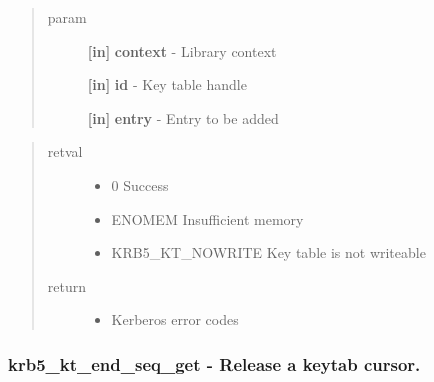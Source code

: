 \documentclass[letterpaper,10pt,english]{sphinxmanual}
\begin{document}
\begin{fulllineitems}
\label{appdev/refs/api/krb5_kt_add_entry:c.krb5_kt_add_entry}
\end{fulllineitems}

\begin{quote}\begin{description}
\item[{param}] \leavevmode
\textbf{{[}in{]}} \textbf{context} - Library context

\textbf{{[}in{]}} \textbf{id} - Key table handle

\textbf{{[}in{]}} \textbf{entry} - Entry to be added

\end{description}\end{quote}
\begin{quote}\begin{description}
\item[{retval}] \leavevmode\begin{itemize}
\item {} 
0   Success

\item {} 
ENOMEM   Insufficient memory

\item {} 
KRB5\_KT\_NOWRITE   Key table is not writeable

\end{itemize}

\item[{return}] \leavevmode\begin{itemize}
\item {} 
Kerberos error codes

\end{itemize}

\end{description}\end{quote}


\subsubsection{krb5\_kt\_end\_seq\_get -  Release a keytab cursor.}
\label{appdev/refs/api/krb5_kt_end_seq_get::doc}\label{appdev/refs/api/krb5_kt_end_seq_get:krb5-kt-end-seq-get-release-a-keytab-cursor}
\end{document}

